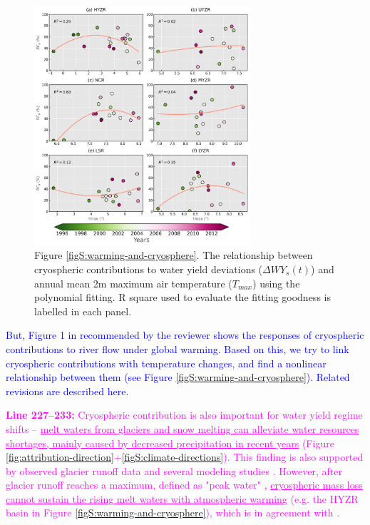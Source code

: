\documentclass[11pt]{article}
\newcounter{reviewer}
\newcommand{\nextreply}[1]{\bigskip \textcolor{blue}{\noindent #1}}
\newcommand{\revised}[3][2]{\bigskip \textcolor{magenta}{\noindent \textbf{Line #2:} #3}}
\begin{document}
\begin{figure}[ht]
    \centering
    \includegraphics[width=8cm]{02-figures/peak-water-analysis.png}
    \captionsetup{labelformat=empty}
    \caption{Figure \ref{figS:warming-and-cryosphere}. The relationship between cryospheric contributions to water yield deviations ($\Delta WY_s(t)$) and annual mean 2m maximum air temperature ($T_{max}$) using the polynomial fitting. R square used to evaluate the fitting goodness is labelled in each panel.}
\end{figure}

\nextreply{But, Figure 1 in  recommended by the reviewer  shows the responses of cryospheric contributions to river flow under global warming. Based on this, we try to link cryospheric contributions with temperature changes, and find a nonlinear relationship between them (see Figure \ref{figS:warming-and-cryosphere}). Related revisions are described here.}

\revised{227--233}{Cryospheric contribution is also important for water yield regime shifts -- \ul{melt waters from glaciers and snow melting can alleviate water resources shortages, mainly caused by decreased precipitation in recent years} (Figure \ref{fig:attribution-direction}+\ref{figS:climate-directions}). This finding is also supported by observed glacier runoff data \citep{yao2010glacial} and several modeling studies \citep{lutz2014consistent, Zhang2020VariationOM, wang2021tp}. 
However, after glacier runoff reaches a maximum, defined as "peak water" \citep{gleick2010peak}, \ul{cryospheric mass loss cannot sustain the rising melt waters with atmospheric warming} (e.g. the HYZR basin in Figure \ref{figS:warming-and-cryosphere}), which is in agreement with \citet{huss2018global}.}
\end{document}
